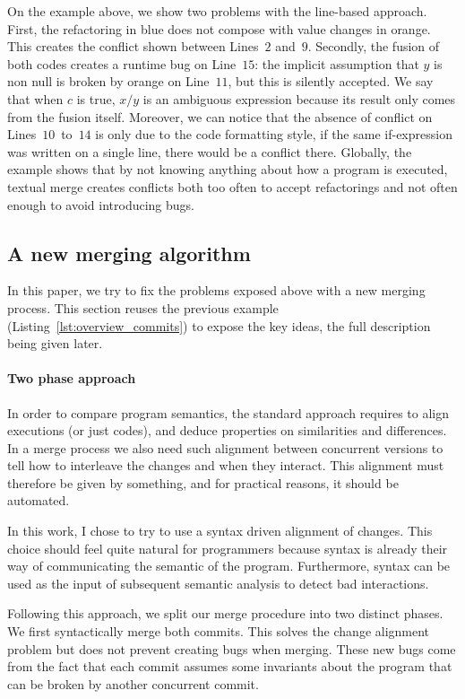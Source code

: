 \documentclass[a4paper,11pt]{article}
\begin{document}
On the example above, we show two problems with the line-based
approach. First, the refactoring in blue does not compose with value
changes in orange. This creates the conflict shown between Lines~$2$
and~$9$. Secondly, the fusion of both codes creates a runtime bug on
Line~$15$: the implicit assumption that $y$ is non null is broken by
orange on Line~$11$, but this is silently accepted. We say that when
$c$ is true, $x / y$ is an ambiguous expression because its result
only comes from the fusion itself. Moreover, we can notice that the
absence of conflict on Lines~$10$~to~$14$ is only due to the code
formatting style, if the same if-expression was written on a single
line, there would be a conflict there. Globally, the example shows
that by not knowing anything about how a program is executed, textual
merge creates conflicts both too often to accept refactorings and not
often enough to avoid introducing bugs.

\subsection{A new merging algorithm}
In this paper, we try to fix the problems exposed above with a new
merging process.  This section reuses the previous example
(Listing~\ref{lst:overview_commits}) to expose the key ideas, the full
description being given later.

\paragraph{Two phase approach}
In order to compare program semantics, the standard approach requires
to align executions (or just codes), and deduce properties on
similarities and differences. In a merge process we also need such
alignment between concurrent versions to tell how to interleave the
changes and when they interact. This alignment must therefore be given
by something, and for practical reasons, it should be automated.

In this work, I chose to try to use a syntax driven alignment of
changes. This choice should feel quite natural for programmers because
syntax is already their way of communicating the semantic of the
program. Furthermore, syntax can be used as the input of subsequent
semantic analysis to detect bad interactions.

Following this approach, we split our merge procedure into two
distinct phases. We first syntactically merge both commits. This
solves the change alignment problem but does not prevent creating bugs
when merging. These new bugs come from the fact that each commit
assumes some invariants about the program that can be broken by
another concurrent commit.
\end{document}
